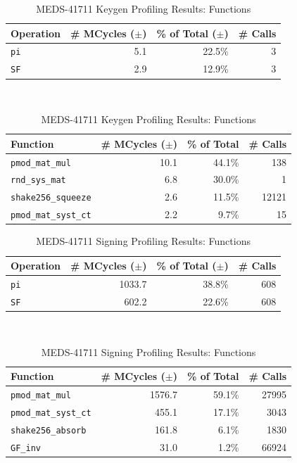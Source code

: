 \documentclass[11pt,a4paper]{report}
\begin{document}
\begin{table}[]
  \centering
  \begin{tabular}{lrrr}
    \toprule
    \textbf{Operation} & \textbf{\# MCycles} ($\pm$) & \textbf{\% of Total} ($\pm$) & \textbf{\# Calls} \\
    \midrule
    \texttt{pi} & 5.1 & 22.5\% & 3 \\
    \texttt{SF} & 2.9 & 12.9\% & 3 \\
    \bottomrule
  \end{tabular}
  \caption{MEDS-41711 Keygen Profiling Results: Operations}
  \label{tab:medskeygenoperations}
  ~\\
  \begin{tabular}{lrrr}
    \toprule
    \textbf{Function} & \textbf{\# MCycles} ($\pm$) & \textbf{\% of Total} & \textbf{\# Calls} \\
    \midrule
    \texttt{pmod\_mat\_mul} & 10.1 & 44.1\% & 138 \\
    \texttt{rnd\_sys\_mat} & 6.8 & 30.0\% & 1 \\
    \texttt{shake256\_squeeze} & 2.6 & 11.5\% & 12121 \\
    \texttt{pmod\_mat\_syst\_ct} & 2.2 & 9.7\% & 15 \\
    \bottomrule
  \end{tabular}
  \caption{MEDS-41711 Keygen Profiling Results: Functions}
  \label{tab:medskeygenfunctions}
\end{table}

\begin{table}[]
  \centering
  \begin{tabular}{lrrr}
    \toprule
    \textbf{Operation} & \textbf{\# MCycles} ($\pm$) & \textbf{\% of Total} ($\pm$) & \textbf{\# Calls} \\
    \midrule
    \texttt{pi} & 1033.7 & 38.8\% & 608 \\
    \texttt{SF} & 602.2 & 22.6\% & 608 \\
    \bottomrule
  \end{tabular}
  \caption{MEDS-41711 Signing Profiling Results: Operations}
  \label{tab:medssigningoperations}
  ~\\
  \begin{tabular}{lrrr}
    \toprule
    \textbf{Function} & \textbf{\# MCycles} ($\pm$) & \textbf{\% of Total} & \textbf{\# Calls} \\
    \midrule
    \texttt{pmod\_mat\_mul} & 1576.7 & 59.1\% & 27995 \\
    \texttt{pmod\_mat\_syst\_ct} & 455.1 & 17.1\% & 3043 \\
    \texttt{shake256\_absorb} & 161.8 & 6.1\% & 1830 \\
    \texttt{GF\_inv} & 31.0 & 1.2\% & 66924 \\
    \bottomrule
  \end{tabular}
  \caption{MEDS-41711 Signing Profiling Results: Functions}
  \label{tab:medssigningfunctions}
\end{table}
\end{document}
